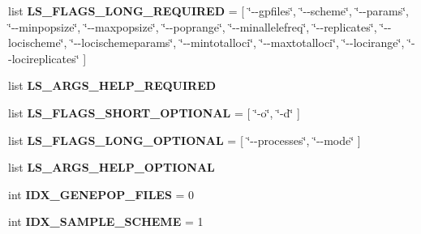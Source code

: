 \begin{DoxyCompactItemize}
\item 
list {\bfseries L\+S\+\_\+\+F\+L\+A\+G\+S\+\_\+\+L\+O\+N\+G\+\_\+\+R\+E\+Q\+U\+I\+R\+ED} = \mbox{[} \char`\"{}-\/-\/gpfiles\char`\"{}, \char`\"{}-\/-\/scheme\char`\"{}, \char`\"{}-\/-\/params\char`\"{}, \char`\"{}-\/-\/minpopsize\char`\"{}, \char`\"{}-\/-\/maxpopsize\char`\"{}, \char`\"{}-\/-\/poprange\char`\"{}, \char`\"{}-\/-\/minallelefreq\char`\"{}, \char`\"{}-\/-\/replicates\char`\"{}, \char`\"{}-\/-\/locischeme\char`\"{}, \char`\"{}-\/-\/locischemeparams\char`\"{}, \char`\"{}-\/-\/mintotalloci\char`\"{}, \char`\"{}-\/-\/maxtotalloci\char`\"{}, \char`\"{}-\/-\/locirange\char`\"{}, \char`\"{}-\/-\/locireplicates\char`\"{} \mbox{]}\hypertarget{namespacenegui_1_1pgdriveneestimator_a8bbe97508573b995c1b4647b14b3bad5}{}\label{namespacenegui_1_1pgdriveneestimator_a8bbe97508573b995c1b4647b14b3bad5}

\item 
list {\bfseries L\+S\+\_\+\+A\+R\+G\+S\+\_\+\+H\+E\+L\+P\+\_\+\+R\+E\+Q\+U\+I\+R\+ED}\hypertarget{namespacenegui_1_1pgdriveneestimator_a52b60d12ffe6a87aacf57d1d6ef98cba}{}\label{namespacenegui_1_1pgdriveneestimator_a52b60d12ffe6a87aacf57d1d6ef98cba}

\item 
list {\bfseries L\+S\+\_\+\+F\+L\+A\+G\+S\+\_\+\+S\+H\+O\+R\+T\+\_\+\+O\+P\+T\+I\+O\+N\+AL} = \mbox{[} \char`\"{}-\/o\char`\"{}, \char`\"{}-\/d\char`\"{} \mbox{]}\hypertarget{namespacenegui_1_1pgdriveneestimator_a9faf32e01452fe45ae54a6462c39a5af}{}\label{namespacenegui_1_1pgdriveneestimator_a9faf32e01452fe45ae54a6462c39a5af}

\item 
list {\bfseries L\+S\+\_\+\+F\+L\+A\+G\+S\+\_\+\+L\+O\+N\+G\+\_\+\+O\+P\+T\+I\+O\+N\+AL} = \mbox{[} \char`\"{}-\/-\/processes\char`\"{}, \char`\"{}-\/-\/mode\char`\"{} \mbox{]}\hypertarget{namespacenegui_1_1pgdriveneestimator_a4c3f7a4b71a9b4887adc55f489cc4ace}{}\label{namespacenegui_1_1pgdriveneestimator_a4c3f7a4b71a9b4887adc55f489cc4ace}

\item 
list {\bfseries L\+S\+\_\+\+A\+R\+G\+S\+\_\+\+H\+E\+L\+P\+\_\+\+O\+P\+T\+I\+O\+N\+AL}
\item 
int {\bfseries I\+D\+X\+\_\+\+G\+E\+N\+E\+P\+O\+P\+\_\+\+F\+I\+L\+ES} = 0\hypertarget{namespacenegui_1_1pgdriveneestimator_aad695bd8267c30231f883702b2c6651a}{}\label{namespacenegui_1_1pgdriveneestimator_aad695bd8267c30231f883702b2c6651a}

\item 
int {\bfseries I\+D\+X\+\_\+\+S\+A\+M\+P\+L\+E\+\_\+\+S\+C\+H\+E\+ME} = 1\hypertarget{namespacenegui_1_1pgdriveneestimator_a7a0eaba5f60aaf4975560c3a4d0f0136}{}\label{namespacenegui_1_1pgdriveneestimator_a7a0eaba5f60aaf4975560c3a4d0f0136}


\end{DoxyCompactItemize}

